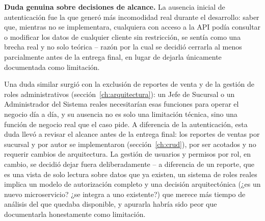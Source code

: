 \textbf{Duda genuina sobre decisiones de alcance.} La ausencia inicial de
autenticación fue la que generó más incomodidad real durante el desarrollo: saber que,
mientras no se implementara, cualquiera con acceso a la API podía consultar o
modificar los datos de cualquier cliente sin restricción, se sentía como una brecha
real y no solo teórica -- razón por la cual se decidió cerrarla al menos parcialmente
antes de la entrega final, en lugar de dejarla únicamente documentada como limitación.

Una duda similar surgió con la exclusión de reportes de venta y de la gestión de roles
administrativos (sección~\ref{ch:arquitectura}): un Jefe de Sucursal o un Administrador
del Sistema reales necesitarían esas funciones para operar el negocio día a día, y su
ausencia no es solo una limitación técnica, sino una función de negocio real que el
caso pide. A diferencia de la autenticación, esta duda llevó a revisar el alcance
antes de la entrega final: los reportes de ventas por sucursal y por autor se
implementaron (sección~\ref{ch:crud}), por ser acotados y no requerir cambios de
arquitectura. La gestión de usuarios y permisos por rol, en cambio, se decidió
dejar fuera deliberadamente -- a diferencia de un reporte, que es una vista de solo
lectura sobre datos que ya existen, un sistema de roles reales implica un modelo de
autorización completo y una decisión arquitectónica (¿es un nuevo microservicio? ¿se
integra a uno existente?) que merece más tiempo de análisis del que quedaba
disponible, y apurarla habría sido peor que documentarla honestamente como
limitación.
